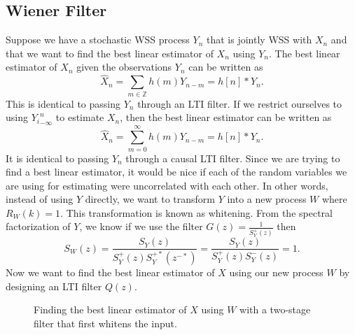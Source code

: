 \subsection{Wiener Filter}
Suppose we have a stochastic WSS process $Y_n$ that is jointly WSS with $X_n$ and that we want to find the best linear estimator of $X_n$ using $Y_n$.
The best linear estimator of $X_n$ given the observations $Y_n$ can be written as \[
	\hat{X}_n = \sum_{m\in\mathbb{Z}}h(m)Y_{n-m} = h[n] * Y_n.
\]
This is identical to passing $Y_n$ through an LTI filter.
If we restrict ourselves to using ${Y_i}_{-\infty}^{n}$ to estimate $X_n$, then the best linear estimator can be written as \[
	\hat{X}_n = \sum_{m=0}^\infty h(m)Y_{n-m} = h[n] * Y_n.
\]
It is identical to passing $Y_n$ through a causal LTI filter.
Since we are trying to find a best linear estimator, it would be nice if each of the random variables we are using for estimating were uncorrelated with each other.
In other words, instead of using $Y$ directly, we want to transform $Y$ into a new process $W$ where $R_W(k) = 1$.
This transformation is known as whitening.
From the spectral factorization of $Y$, we know if we use the filter $G(z) =\frac{1}{S_Y^+(z)}$ then \[
	S_W(z) = \frac{S_Y(z)}{S_Y^+(z)S_Y^{+*}(z^{-*})} = \frac{S_Y(z)}{S_Y^+(z)S_Y^-(z)} = 1.
\]
Now we want to find the best linear estimator of $X$ using our new process $W$ by designing an LTI filter $Q(z)$.
\begin{gitbook-image}
\begin{figure}[!h]
  \centering
	\caption{Finding the best linear estimator of $X$ using $W$ with a two-stage filter that first whitens the input.}
  \label{fig:wiener-filter}
\end{figure}
\end{gitbook-image}
